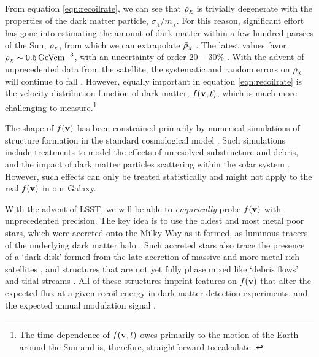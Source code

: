 From equation \ref{eqn:recoilrate}, we can see that $\tilde{\rho}_\mathrm{\chi}$ is trivially degenerate with the properties of the dark matter particle, $\sigma_\chi/m_\chi$. For this reason, significant effort has gone into estimating the amount of dark matter within a few hundred parsecs of the Sun, $\rho_\mathrm{\chi}$, from which we can extrapolate $\tilde{\rho}_\mathrm{\chi}$ \citep[see][for a review]{1404.1938}. The latest values favor $\rho_\mathrm{\chi} \sim 0.5\,{\rm GeV cm}^{-3}$, with an uncertainty of order $20-30$\% \citep[\eg,][]{2014A&A...571A..92B,2018MNRAS.478.1677S}. With the advent of unprecedented data from the \Gaia satellite, the systematic and random errors on $\rho_\mathrm{\chi}$ will continue to fall \citep{1404.1938}. However, equally important in equation \ref{eqn:recoilrate} is the velocity distribution function of dark matter, $f({\bf v},t)$, which is much more challenging to measure.\footnote{The time dependence of $f({\bf v},t)$ owes primarily to the motion of the Earth around the Sun and is, therefore, straightforward to calculate \citep[\eg,][]{1986PhRvD..33.3495D}.}

The shape of $f({\bf v})$ has been constrained primarily by numerical simulations of structure formation in the standard cosmological model \citep[\eg,][]{2009MNRAS.395..797V,1210.2721}. Such simulations include treatments to model the effects of unresolved substructure and debris, and the impact of dark matter particles scattering within the solar system \citep[\eg,][]{2009PhRvD..79j3531P}. However, such effects can only be treated statistically and might not apply to the real $f({\bf v})$ in our Galaxy.

With the advent of LSST, we will be able to {\it empirically} probe $f({\bf v})$ with unprecedented precision. The key idea is to use the oldest and most metal poor stars, which were accreted onto the Milky Way as it formed, as luminous tracers of the underlying dark matter halo \citep{Lisanti:2011as,Kuhlen:2012fz,2014MNRAS.445L..21T,Lisanti:2014dva,2018PhRvL.120d1102H,Necib:2018b}. Such accreted stars also trace the presence of a `dark disk' formed from the late accretion of massive and more metal rich satellites \citep{1989AJ.....98.1554L,2008MNRAS.389.1041R,2009MNRAS.397...44R,2014MNRAS.444..515R,2015MNRAS.450.2874R}, and structures that are not yet fully phase mixed like `debris flows' \citep[\eg,][]{Lisanti:2011as,2018MNRAS.477.1472B,2018Natur.563...85H,necib2018} and tidal streams \citep[\eg,][]{2005PhRvD..71d3516F,1807.09004}. All of these structures imprint features on $f({\bf v})$ that alter the expected flux at a given recoil energy in dark matter detection experiments, and the expected annual modulation signal \citep[\eg,][]{2005PhRvD..71d3516F,2009ApJ...696..920B,2018arXiv181011468E}.

